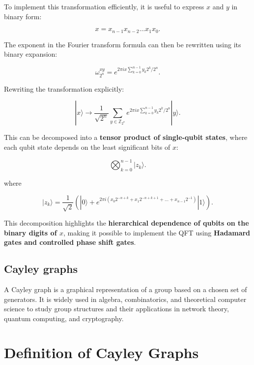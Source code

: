 \documentclass[11pt]{article}
\theoremstyle{definition}
\begin{document}
To implement this transformation efficiently, it is useful to express \( x \) and \( y \) in binary form:

\[
x = x_{n-1} x_{n-2} \dots x_1 x_0.
\]

The exponent in the Fourier transform formula can then be rewritten using its binary expansion:

\[
\omega_{2^n}^{xy} = e^{2\pi i x \sum_{k=0}^{n-1} y_k 2^k / 2^n}.
\]

Rewriting the transformation explicitly:

\[
| x \rangle \to \frac{1}{\sqrt{2^n}} \sum_{y \in \mathbb{Z}_{2^n}} e^{2\pi i x \sum_{k=0}^{n-1} y_k 2^k / 2^n} | y \rangle.
\]

This can be decomposed into a \textbf{tensor product of single-qubit states}, where each qubit state depends on the least significant bits of \( x \):

\[
\bigotimes_{k=0}^{n-1} | z_k \rangle.
\]

where

\[
| z_k \rangle = \frac{1}{\sqrt{2}} ( | 0 \rangle + e^{2\pi i ( x_0 2^{-n+k} + x_1 2^{-n+k+1} + \dots + x_{n-1} 2^{-1} )} | 1 \rangle ).
\]

This decomposition highlights the \textbf{hierarchical dependence of qubits on the binary digits of \( x \)}, making it possible to implement the QFT using \textbf{Hadamard gates and controlled phase shift gates}.

\subsection*{Cayley graphs}

A Cayley graph is a graphical representation of a group based on a chosen set of generators. It is widely used in algebra, combinatorics, and theoretical computer science to study group structures and their applications in network theory, quantum computing, and cryptography.

\section*{Definition of Cayley Graphs}
\end{document}
